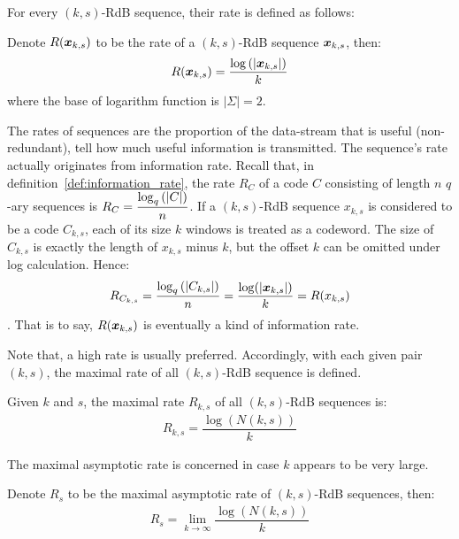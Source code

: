For every $(k,s)$-RdB sequence, their rate is defined as follows:
\begin{definition}[Rate]
    Denote $R({\boldsymbol x}_{k,s})$ to be the rate of a $(k,s)$-RdB sequence ${\boldsymbol x}_{k,s}$, then:
    \begin{align}
        R({\boldsymbol x}_{k,s}) = \dfrac{\log\left(\left \lvert {\boldsymbol x}_{k,s} \right \rvert\right)}{k}
    \end{align}
    where the base of logarithm function is $\left\lvert\Sigma\right\rvert=2$.
\end{definition}

The rates of sequences are the proportion of the data-stream that is useful (non-redundant), tell how much useful information is transmitted. The sequence's rate actually originates from information rate. Recall that, in definition~\ref{def:information_rate}, the rate $R_{C}$ of a code $C$ consisting of length $n$ $q$-ary sequences is $R_{C}=\dfrac{\log_{q}\left(\left \lvert C \right \rvert\right)}{n}$. If a $(k,s)$-RdB sequence $x_{k,s}$ is considered to be a code $C_{k,s}$, each of its size $k$ windows is treated as a codeword. The size of $C_{k,s}$ is exactly the length of $x_{k,s}$ minus $k$, but the offset $k$ can be omitted under log calculation. Hence: $$R_{C_{k,s}}= \dfrac{\log_{q}\left(\left \lvert C_{k,s} \right \rvert\right)}{n} = \dfrac{\log(\left \lvert {\boldsymbol x}_{k,s} \right \rvert)}{k} = R(x_{k,s})$$. That is to say, $R({\boldsymbol x}_{k,s})$ is eventually a kind of information rate.

Note that, a high rate is usually preferred. Accordingly, with each given pair $(k,s)$, the maximal rate of all $(k,s)$-RdB sequence is defined.
\begin{definition}
    Given $k$ and $s$, the maximal rate $R_{k,s}$ of all $(k,s)$-RdB sequences is:
    \begin{align}
        R_{k,s} = \dfrac{\log(N(k,s))}{k}
    \end{align}
\end{definition}


The maximal asymptotic rate is concerned in case $k$ appears to be very large.
\begin{definition}
    Denote $R_{s}$ to be the maximal asymptotic rate of $(k,s)$-RdB sequences, then:
    \begin{align}
        R_{s} = \lim_{k\to\infty}\dfrac{\log(N(k,s))}{k}
    \end{align}
\end{definition}

